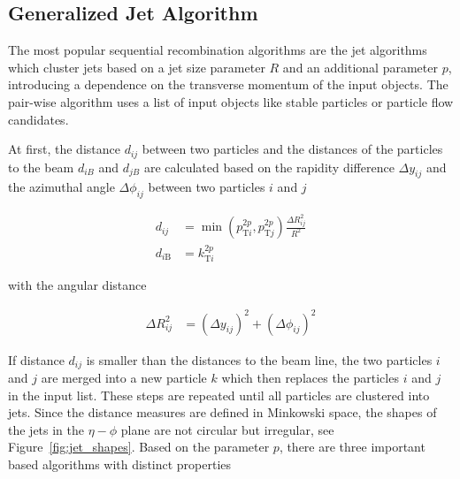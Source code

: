 \subsection{Generalized \kt Jet Algorithm}

The most popular sequential recombination algorithms are the \kt jet
algorithms which cluster jets based on a jet size parameter $R$ and an
additional parameter $p$, introducing a dependence on the transverse momentum of
the input objects. The pair-wise algorithm uses a list of input objects like stable
particles or particle flow candidates. 

At first, the distance $d_{ij}$ between two particles and the distances of the
particles to the beam $d_{iB}$ and $d_{jB}$ are calculated based on the rapidity
difference $\Delta y_{ij}$ and the azimuthal angle $\Delta \phi_{ij}$ between two
particles $i$ and $j$

\begin{align*} 
    d_{ij} &= \min(p_{\mathrm{T}i}^{2p},p_{\mathrm{T}j}^{2p})\frac{\Delta R_{ij}^2}{R^2}\\
    d_{i\mathrm{B}} &= k_{\mathrm{T}i}^{2p}
\end{align*} 

with the angular distance

\begin{align*}
    \Delta R_{ij}^2 &= (\Delta y_{ij})^2 + (\Delta \phi_{ij})^2
\end{align*} 

If distance $d_{ij}$ is smaller than the distances to the beam line, the two
particles $i$ and $j$ are merged into a new particle $k$ which then replaces the
particles $i$ and $j$ in the input list. These steps are repeated until all
particles are clustered into jets. Since the distance measures are defined in
Minkowski space, the shapes of the jets in the $\eta-\phi$ plane are not circular but
irregular, see Figure~\ref{fig:jet_shapes}. Based on the parameter $p$, there
are three important \kt based algorithms with distinct properties

